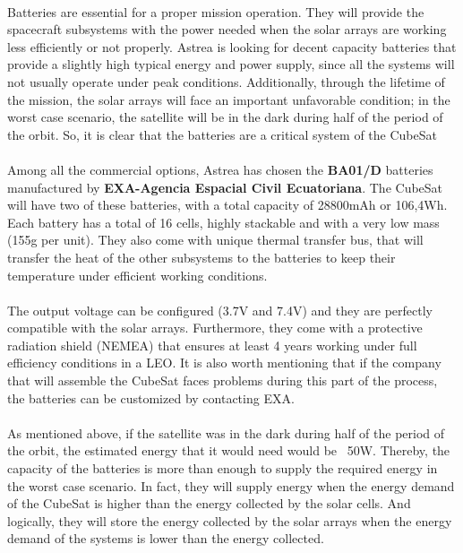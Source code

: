 \paragraph{}	Batteries are essential for a proper mission operation. They will provide the spacecraft subsystems with the power needed when the solar arrays are working less efficiently or not properly. Astrea is looking for decent capacity batteries that provide a slightly high typical energy and power supply, since all the systems will not usually operate under peak conditions. Additionally, through the lifetime of the mission, the solar arrays will face an important unfavorable condition; in the worst case scenario, the satellite will be in the dark during half of the period of the orbit. So, it is clear that the batteries are a critical system of the CubeSat

\paragraph{}Among all the commercial options, Astrea has chosen the \textbf{BA01/D} batteries manufactured by \textbf{EXA-Agencia Espacial Civil Ecuatoriana}. The CubeSat will have two of these batteries, with a total capacity of 28800mAh or 106,4Wh. Each battery has a total of 16 cells, highly stackable and with a very low mass (155g per unit). They also come with unique thermal transfer bus, that will transfer the heat of the other subsystems to the batteries to keep their temperature under efficient working conditions.

\paragraph{}The output voltage can be configured (3.7V and 7.4V) and they are perfectly compatible with the solar arrays. Furthermore, they come with a protective radiation shield (NEMEA) that ensures at least 4 years working under full efficiency conditions in a LEO. It is also worth mentioning that if the company that will assemble the CubeSat faces problems during this part of the process, the batteries can be customized by contacting EXA.

\paragraph{}As mentioned above, if the satellite was in the dark during half of the period of the orbit, the estimated energy that it would need would be ~50W. Thereby, the capacity of the batteries is more than enough to supply the required energy in the worst case scenario. In fact, they will supply energy when the energy demand of the CubeSat is higher than the energy collected by the solar cells. And logically, they will store the energy collected by the solar arrays when the energy demand of the systems is lower than the energy collected.

